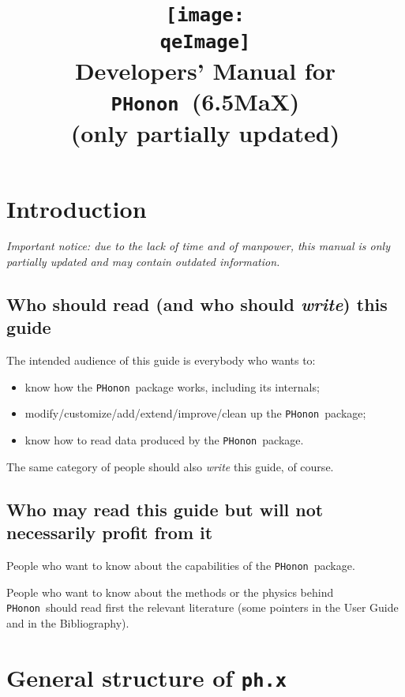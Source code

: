 \documentclass[12pt,a4paper]{article}
\def\version{6.5MaX}
\def\qeImage{../../Doc/quantum_espresso.pdf}
\def\phx{\texttt{ph.x}}
\def\PHonon{\texttt{PHonon}}
\begin{document}
 
\author{}
\date{}
\title{
  \texttt{[image: \\qeImage]} \\
  \Huge Developers' Manual for \PHonon\ (\version)
    \\ \Large (only partially updated)
}
\maketitle

\tableofcontents

\newpage

\section{Introduction}

{\em Important notice: due to the lack of time and of manpower, this
manual is only partially updated and may contain outdated information.}

\subsection{Who should read (and who should {\em write}) this guide}

The intended audience of this guide is everybody who wants to:
\begin{itemize}
\item know how the \PHonon\ package works, including its internals;
\item modify/customize/add/extend/improve/clean up the \PHonon\ package;
\item know how to read data produced by the \PHonon\ package.
\end{itemize}
The same category of people should also {\em write} this guide, of course.

\subsection{Who may read this guide but will not necessarily profit from it}

People who want to know about the capabilities of the \PHonon\ package.

People who want to know about the methods or the physics
behind \PHonon\ should read first the relevant  
literature (some pointers in the User Guide and in the Bibliography).


\section{General structure of \phx}
\end{document}
